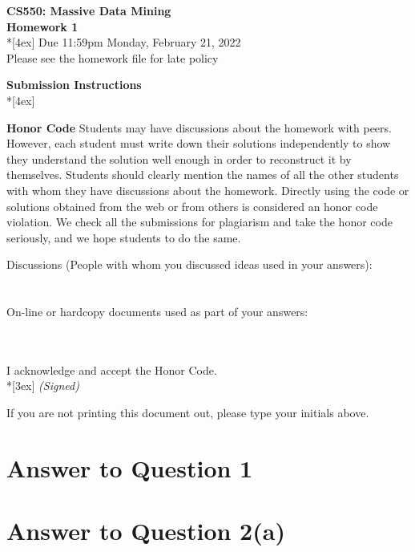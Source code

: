 \documentclass[11pt]{article}
\begin{document}
\thispagestyle{empty}
\parindent 0pt
\vfill
\large

\begin{center}
\LARGE{\bf \textsf{CS550: Massive Data Mining}}\\ {\bf \textsf{Homework 1}} 
\\*[4ex]
Due 11:59pm Monday, February 21, 2022\\
Please see the homework file for late policy
\end{center}

\pagebreak[4]
\begin{center}
\LARGE{\bf \textsf{Submission Instructions}} \\*[4ex]
\end{center}

\textbf{Honor Code } Students may have discussions about the homework with peers. However, each student must write down their solutions independently to show they understand the solution well enough in order to reconstruct it by themselves.  Students should clearly mention the names of all the other students with whom they have discussions about the homework. Directly using the code or solutions obtained from the web or from others is considered an honor code violation. We check all the submissions for plagiarism and take the honor code seriously, and we hope students to do the same. 

\vfill
\vfill

Discussions (People with whom you discussed ideas used in your answers): \\\\\\
On-line or hardcopy documents used as part of your answers: \\\\\\
\vfill

\vfill

I acknowledge and accept the Honor Code.\\*[3ex]
\bigskip
\textit{(Signed)}\hrulefill

If you are not printing this document out, please type your initials above.

\vfill
\vfill

\pagebreak[4]
\section*{Answer to Question 1}

\pagebreak[4]
\section*{Answer to Question 2(a)}
\end{document}

